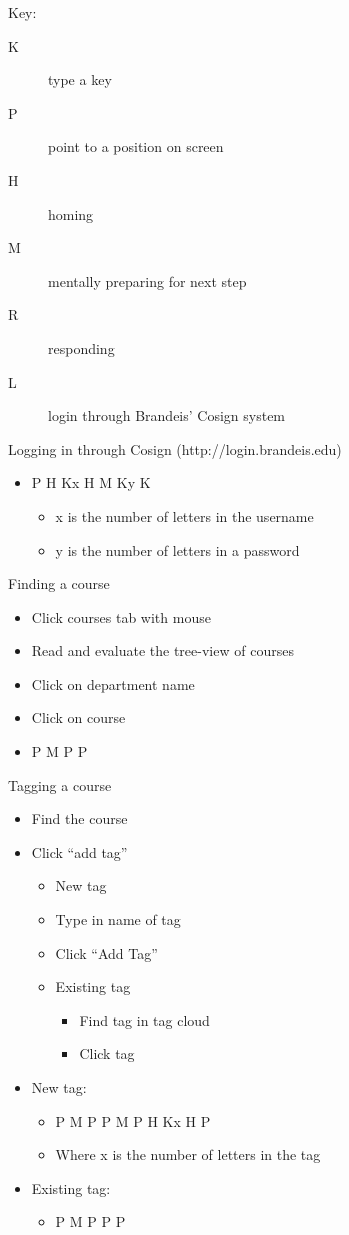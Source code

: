\documentclass[12pt]{report}
\begin{document}
Key:
\begin{description}
\item[K] type a key
\item[P] point to a position on screen
\item[H] homing
\item[M] mentally preparing for next step
\item[R] responding
\item[L] login through Brandeis' Cosign system
\end{description}
Logging in through Cosign (http://login.brandeis.edu)
\begin{itemize}
\item P H Kx H M Ky K
    \begin{itemize}
    \item x is the number of letters in the username
    \item y is the number of letters in a password 
    \end{itemize}
\end{itemize}
Finding a course
\begin{itemize}
\item Click courses tab with mouse
\item Read and evaluate the tree-view of courses
\item Click on department name
\item Click on course
\item P M P P
\end{itemize}
Tagging a course
\begin{itemize}
\item Find the course
\item Click “add tag”
    \begin{itemize}
    \item New tag
    \item Type in name of tag
    \item Click ``Add Tag''
    \item Existing tag
          \begin{itemize}
          \item Find tag in tag cloud
          \item Click tag
          \end{itemize}
    \end{itemize}
\item New tag:
    \begin{itemize}
    \item P M P P M P H Kx H P
    \item Where x is the number of letters in the tag
    \end{itemize}
\item Existing tag:
    \begin{itemize}
    \item P M P P P
    \end{itemize}
\end{itemize}
\end{document}
